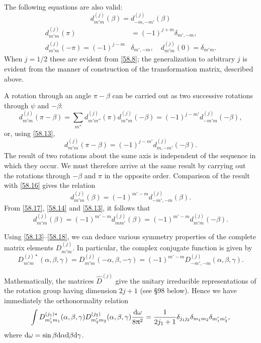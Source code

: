 The following equations are also valid:
\begin{equation}\label{58.14}
d_{m'm}^{(j)}(\beta)=d_{-m,-m'}^{(j)}(\beta)
\end{equation}
\begin{equation}\label{58.15}
\begin{split}
d_{m'm}^{(j)}(\pi)&=(-1)^{j+m}\delta_{m',-m},\\
d_{m'm}^{(j)}(-\pi)=(-1)^{j-m}&\delta_{m',-m},\quad d_{m'm}^{(j)}(0)=\delta_{m'm}.
\end{split}
\end{equation}
When $ j = 1/2 $ these are evident from \eqref{58.8}; the generalization to arbitrary $ j $ is evident from the manner of construction of the transformation matrix, described above.

A rotation through an angle $ \pi-\beta $ can be carried out as two successive rotations through $\psi$ and $ -\beta $:
\[ d_{m'm}^{(j)}(\pi-\beta)=\sum_{m''}d_{m'm''}^{(j)}(\pi)d_{m''m}^{(j)}(-\beta)=(-1)^{j-m'}d_{-m'm}^{(j)}(-\beta), \]
or, using \eqref{58.13},
\begin{equation}\label{58.16}
d_{m'm}^{(j)}(\pi-\beta)=(-1)^{j-m'}d_{m,-m'}^{(j)}(-\beta).
\end{equation}
The result of two rotations about the same axis is independent of the sequence in which they occur. We must therefore arrive at the same result by carrying out the rotations through $ -\beta $ and $ \pi $ in the opposite order. Comparison of the result with \eqref{58.16} gives the relation
\begin{equation}\label{58.17}
d_{m'm}^{(j)}(\beta)=(-1)^{m'-m}d_{-m',-m}^{(j)}(\beta).
\end{equation}
From \eqref{58.17}, \eqref{58.14} and \eqref{58.13}, it follows that
\begin{equation}\label{58.18}
d_{m'm}^{(j)}(\beta)=(-1)^{m'-m}d_{mm'}^{(j)}(\beta)=(-1)^{m'-m}d_{m'm}^{(j)}(-\beta).
\end{equation}


Using \eqref{58.13}–\eqref{58.18}, we can deduce various symmetry properties of the complete matrix elements $ D_{m'm}^{(j)} $. In particular, the complex conjugate function is given by
\begin{equation}\label{58.19}
D_{m'm}^{(j)*}(\alpha,\beta,\gamma)=D_{m'm}^{(j)}(-\alpha,\beta,-\gamma)=(-1)^{m'-m}D_{-m',-m}^{(j)}(\alpha,\beta,\gamma).
\end{equation}


Mathematically, the matrices $ \hat{D}^{(j)} $ give the unitary irreducible representations of the rotation group having dimension $ 2j + 1 $ (see \S98 below). Hence we have immediately the orthonormality relation
\begin{equation}\label{58.20}
\int D_{m_1'm_1}^{(j_1)*}(\alpha,\beta,\gamma)D_{m_2'm_2}^{(j_2)}(\alpha,\beta,\gamma)\frac{\mathrm{d}\omega}{8\uppi^2}=\frac{1}{2j_1+1}\delta_{j_1j_2}\delta_{m_1m_2}\delta_{m_1'm_2'},
\end{equation}
where $ \mathrm{d}\omega = \sin \beta \mathrm{d}\alpha \mathrm{d}\beta \mathrm{d}\gamma $.

